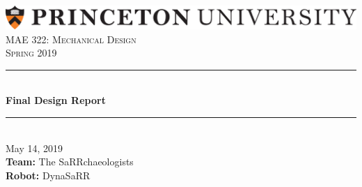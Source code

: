 

%

\begin{titlepage}

\newcommand{\HRule}{\rule{\linewidth}{0.5mm}} %

\center %
 
\includegraphics[width=\columnwidth]{Images/PU1linehighres.png}\\[1cm]
\textsc{\Large MAE 322: Mechanical Design}\\[0.5cm] %
\textsc{\large Spring 2019}\\[1cm] %


\HRule \\[0.6cm]
{ \huge \bfseries Final Design Report}\\[0.4cm] %
\HRule \\[1cm]

{\Large May 14, 2019}\\[2cm] %

 

{\large \textbf{Team:} The SaRRchaeologists}\\[1cm]
{\large \textbf{Robot:} DynaSaRR}\\[1.6cm]


\end{titlepage}
